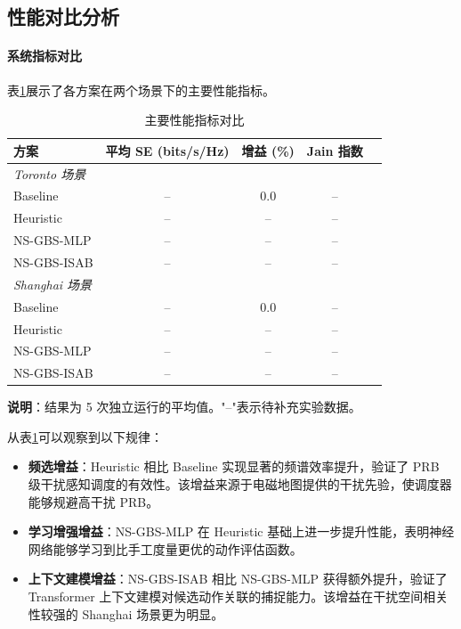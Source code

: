 \documentclass[type=master]{fduthesis}
\begin{document}
\subsection{性能对比分析}
\label{subsec:ch4_performance}

\paragraph{系统指标对比}
表\ref{tab:ch4_performance}展示了各方案在两个场景下的主要性能指标。

\begin{table}[t]
\centering
\caption{主要性能指标对比}
\label{tab:ch4_performance}
\begin{tabular}{lcccc}
\toprule
\textbf{方案} & \textbf{平均 SE (bits/s/Hz)} & \textbf{增益 (\%)} & \textbf{Jain 指数} \\
\midrule
\multicolumn{4}{l}{\textit{Toronto 场景}} \\
Baseline & -- & 0.0 & -- \\
Heuristic & -- & -- & -- \\
NS-GBS-MLP & -- & -- & -- \\
NS-GBS-ISAB & -- & -- & -- \\
\midrule
\multicolumn{4}{l}{\textit{Shanghai 场景}} \\
Baseline & -- & 0.0 & -- \\
Heuristic & -- & -- & -- \\
NS-GBS-MLP & -- & -- & -- \\
NS-GBS-ISAB & -- & -- & -- \\
\bottomrule
\end{tabular}
\begin{minipage}{0.95\linewidth}
\footnotesize
\vspace{0.5em}
\noindent\textbf{说明}：结果为 5 次独立运行的平均值。"--"表示待补充实验数据。
\end{minipage}
\end{table}

从表\ref{tab:ch4_performance}可以观察到以下规律：

\begin{itemize}
\item \textbf{频选增益}：Heuristic 相比 Baseline 实现显著的频谱效率提升，验证了 PRB 级干扰感知调度的有效性。该增益来源于电磁地图提供的干扰先验，使调度器能够规避高干扰 PRB。

\item \textbf{学习增强增益}：NS-GBS-MLP 在 Heuristic 基础上进一步提升性能，表明神经网络能够学习到比手工度量更优的动作评估函数。

\item \textbf{上下文建模增益}：NS-GBS-ISAB 相比 NS-GBS-MLP 获得额外提升，验证了 Transformer 上下文建模对候选动作关联的捕捉能力。该增益在干扰空间相关性较强的 Shanghai 场景更为明显。
\end{itemize}
\end{document}
